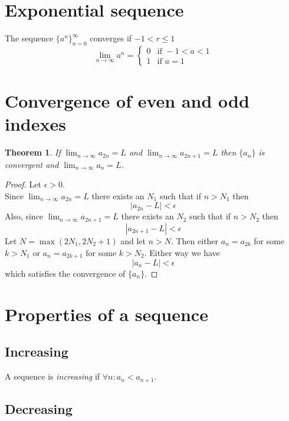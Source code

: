 \documentclass[a4paper]{article}
\begin{document}
\section{Exponential sequence} %

The sequence \({\{a^n\}}_{n=0}^\infty\) converges if \(-1<r\leq 1\)
\[
    \lim_{n\to\infty} a^n = \begin{cases}
        0 & \text{if } -1 < a < 1 \\
        1 & \text{if } a=1
    \end{cases}
\]

\pagebreak

\section{Convergence of even and odd indexes}

\newtheorem*{theorem1}{Theorem}

\begin{theorem1}
    If \(\lim_{n\to\infty}a_{2n}=L\) and \(\lim_{n\to\infty}a_{2n+1}=L\)
    then \(\{a_n\}\) is convergent and \(\lim_{n\to\infty}a_n=L\).
\end{theorem1}
\begin{proof}
    Let \(\epsilon>0\). \\
    Since \(\lim_{n\to\infty}a_{2n}=L\) there exists an \(N_1\) such that
    if \(n>N_1\) then
    \[
        |a_{2n}-L|<\epsilon
    \]
    Also, since \(\lim_{n\to\infty}a_{2n+1}=L\) there exists an \(N_2\) such that
    if \(n>N_2\) then
    \[
        |a_{2n+1}-L|<\epsilon
    \]
    Let \(N=\max(2N_1, 2N_2+1)\) and let \(n>N\).
    Then either \(a_n=a_{2k}\) for some \(k>N_1\) or \(a_n=a_{2k+1}\)
    for some \(k>N_2\). Either way we have
    \[
        |a_n-L|<\epsilon
    \]
    which satisfies the convergence of \(\{a_n\}\).
\end{proof}

\section{Properties of a sequence}

\subsection{Increasing}

A sequence is \textit{increasing} if \(\forall n:  a_n<a_{n+1}\).

\subsection{Decreasing}
\end{document}
